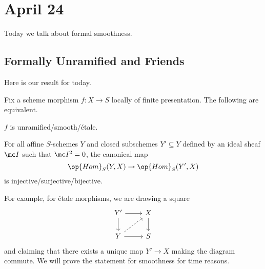 \documentclass[../notes.tex]{subfiles}
\begin{document}
\section{April 24}

Today we talk about formal smoothness.

\subsection{Formally Unramified and Friends}
Here is our result for today.
\begin{theorem} \label{thm:formal-smooth}
	Fix a scheme morphism $f\colon X\to S$ locally of finite presentation. The following are equivalent.
	\begin{listalph}
		\item $f$ is unramified/smooth/\'etale.
		\item For all affine $S$-schemes $Y$ and closed subschemes $Y'\subseteq Y$ defined by an ideal sheaf $\mc I$ such that $\mc I^2=0$, the canonical map
		\[\op{Hom}_S(Y,X)\to\op{Hom}_S(Y',X)\]
		is injective/surjective/bijective.
	\end{listalph}
\end{theorem}
For example, for \'etale morphisms, we are drawing a square
\[\begin{tikzcd}
	{Y'} & X \\
	Y & S
	\arrow[from=1-1, to=2-1]
	\arrow[from=2-1, to=2-2]
	\arrow[from=1-2, to=2-2]
	\arrow[from=1-1, to=1-2]
	\arrow[dashed, from=2-1, to=1-2]
\end{tikzcd}\]
and claiming that there exists a unique map $Y'\to X$ making the diagram commute. We will prove the statement for smoothness for time reasons.
\end{document}
